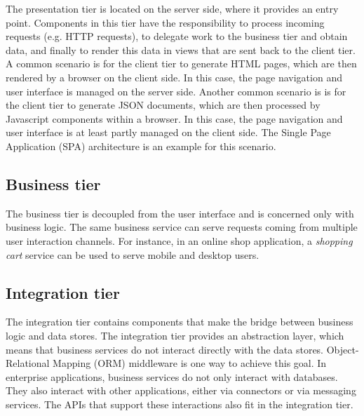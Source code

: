
The presentation tier is located on the server side, where it provides an entry point. Components in this tier have the responsibility to process incoming requests (e.g. HTTP requests), to delegate work to the business tier and obtain data, and finally to render this data in views that are sent back to the client tier. A common scenario is for the client tier to generate HTML pages, which are then rendered by a browser on the client side. In this case, the page navigation and user interface is managed on the server side. Another common scenario is is for the client tier to generate JSON documents, which are then processed by Javascript components within a browser. In this case, the page navigation and user interface is at least partly managed on the client side. The Single Page Application (SPA) architecture is an example for this scenario.

\subsection{Business tier}


The business tier is decoupled from the user interface and is concerned only with business logic. The same business service can serve requests coming from multiple user interaction channels. For instance, in an online shop application, a \emph{shopping cart} service can be used to serve mobile and desktop users.

\subsection{Integration tier}


The integration tier contains components that make the bridge between business logic and data stores. The integration tier provides an abstraction layer, which means that business services do not interact directly with the data stores. Object-Relational Mapping (ORM) middleware is one way to achieve this goal. In enterprise applications, business services do not only interact with databases. They also interact with other applications, either via connectors or via messaging services. The APIs that support these interactions also fit in the integration tier.

